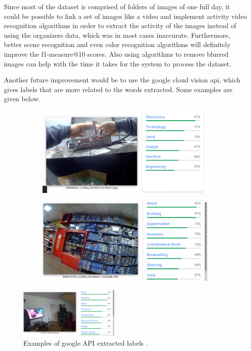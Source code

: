 Since most of the dataset is comprised of folders of images of one full day, it could be possible to link a set of images like a video and implement activity video recognition algorithms in order to extract the activity of the images instead of using the organizers data, which was in most cases inaccurate. Furthermore, better scene recognition and even color recognition algorithms will definitely improve the f1-measure@10 scores. Also using algorithms to remove blurred images can help with the time it takes for the system to process the dataset.

Another future improvement would be to use the google cloud vision api, which gives labels that are more related to the words extracted. Some examples are given below.


\begin{figure}[H]
    \centering
    \captionsetup{justification=centering}
    \begin{subfigure}{0.45\textwidth}
    \includegraphics[width=\textwidth]{Sections/8Conclusion/images/google.png} 
  
    \end{subfigure}
    \begin{subfigure}{0.45\textwidth}
    \includegraphics[width=\textwidth]{Sections/8Conclusion/images/labels.png}
    \end{subfigure}

  \end{figure}


\begin{figure}[H]
    \centering
    \captionsetup{justification=centering}

    \includegraphics[width=0.45\textwidth]{Sections/8Conclusion/images/google_labels_2.png}
    
    \caption{Examples of google API extracted labels .}
\end{figure}
